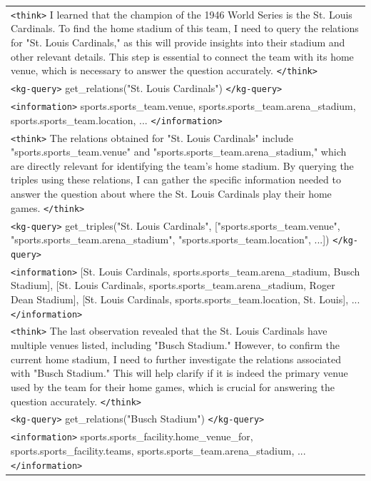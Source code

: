 {\begin{longtable}{>{\raggedright\arraybackslash}p{}}
\texttt{<think>} I learned that the champion of the 1946 World Series is the St. Louis Cardinals. To find the home stadium of this team, I need to query the relations for "St. Louis Cardinals," as this will provide insights into their stadium and other relevant details. This step is essential to connect the team with its home venue, which is necessary to answer the question accurately. \texttt{</think>} \\
\rowcolor{green!10}
\texttt{<kg-query>} get\_relations("St. Louis Cardinals") \texttt{</kg-query>} \\
\rowcolor{yellow!10}
\texttt{<information>} sports.sports\_team.venue, sports.sports\_team.arena\_stadium, sports.sports\_team.location, ... \texttt{</information>} \\
\rowcolor{blue!10}
\texttt{<think>} The relations obtained for "St. Louis Cardinals" include "sports.sports\_team.venue" and "sports.sports\_team.arena\_stadium," which are directly relevant for identifying the team's home stadium. By querying the triples using these relations, I can gather the specific information needed to answer the question about where the St. Louis Cardinals play their home games. \texttt{</think>} \\
\rowcolor{green!10}
\texttt{<kg-query>} get\_triples("St. Louis Cardinals", ["sports.sports\_team.venue", "sports.sports\_team.arena\_stadium", "sports.sports\_team.location", ...]) \texttt{</kg-query>} \\
\rowcolor{yellow!10}
\texttt{<information>} [St. Louis Cardinals, sports.sports\_team.arena\_stadium, Busch Stadium], [St. Louis Cardinals, sports.sports\_team.arena\_stadium, Roger Dean Stadium], [St. Louis Cardinals, sports.sports\_team.location, St. Louis], ... \texttt{</information>} \\
\rowcolor{blue!10}
\texttt{<think>} The last observation revealed that the St. Louis Cardinals have multiple venues listed, including "Busch Stadium." However, to confirm the current home stadium, I need to further investigate the relations associated with "Busch Stadium." This will help clarify if it is indeed the primary venue used by the team for their home games, which is crucial for answering the question accurately. \texttt{</think>} \\
\rowcolor{green!10}
\texttt{<kg-query>} get\_relations("Busch Stadium") \texttt{</kg-query>} \\
\rowcolor{yellow!10}
\texttt{<information>} sports.sports\_facility.home\_venue\_for, sports.sports\_facility.teams, sports.sports\_team.arena\_stadium, ... \texttt{</information>} \\

\end{longtable}}
